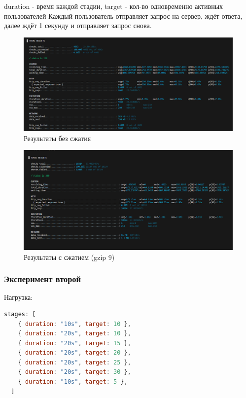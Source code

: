 \documentclass[12pt]{article}
\begin{document}
duration - время каждой стадии, target - кол-во одновременно активных пользователей
Каждый пользователь отправляет запрос на сервер, ждёт ответа, далее ждёт 1 секунду и отправляет запрос снова.

\begin{figure}[H]
    \centering
    \includegraphics[width=1\textwidth]{../images/no-compress_exp1_k6screen.png}
    \caption{Результаты без сжатия}
\end{figure}

\begin{figure}[H]
    \centering
    \includegraphics[width=1\textwidth]{../images/gzip9_exp1_k6screen.png}
    \caption{Результаты с сжатием (gzip 9)}
\end{figure}

\subsubsection{Эксперимент второй}

Нагрузка:

\begin{lstlisting}[language=JavaScript]
   stages: [
    { duration: "10s", target: 10 },
    { duration: "20s", target: 10 },
    { duration: "20s", target: 15 },
    { duration: "20s", target: 20 },
    { duration: "20s", target: 25 },
    { duration: "20s", target: 30 },
    { duration: "10s", target: 5 },
  ]
\end{lstlisting}
\end{document}
